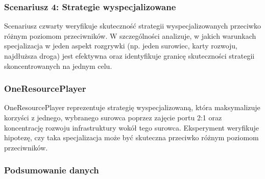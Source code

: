 \documentclass[polish,inz,longabstract]{iithesis}
\begin{document}
\subsubsection{Scenariusz 4: Strategie wyspecjalizowane}

Scenariusz czwarty weryfikuje skuteczność strategii wyspecjalizowanych przeciwko różnym poziomom przeciwników. W szczególności analizuje, w jakich warunkach specjalizacja w jeden aspekt rozgrywki (np. jeden surowiec, karty rozwoju, najdłuższa droga) jest efektywna oraz identyfikuje granicę skuteczności strategii skoncentrowanych na jednym celu.

\subsubsection{OneResourcePlayer}

OneResourcePlayer reprezentuje strategię wyspecjalizowaną, która maksymalizuje korzyści z jednego, wybranego surowca poprzez zajęcie portu 2:1 oraz koncentrację rozwoju infrastruktury wokół tego surowca. Eksperyment weryfikuje hipotezę, czy taka specjalizacja może być skuteczna przeciwko różnym poziomom przeciwników.

\pagebreak

\subsubsection{Podsumowanie danych}

\begin{table}[h]
\centering
\caption{Podsumowanie wyników OneResourcePlayer – metryki podstawowe}
\medskip
\label{tab:oneresource-summary}
\end{table}
\end{document}
